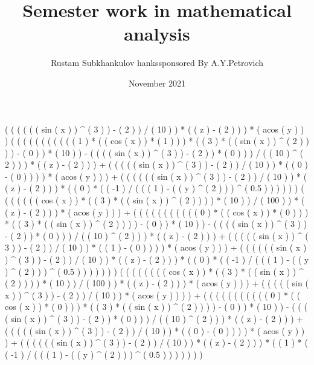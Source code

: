 \documentclass[a4paper, 12pt] {article}
\title{Semester work in mathematical analysis}
\author{Rustam Subkhankulov 	hanks{sponsored By A.Y.Petrovich}}
\date{November 2021}
\begin{document}
 
\maketitle
 (  (  (  (  (  ( sin ( x )  ) ^ ( 3 )  ) - ( 2 )  ) / ( 10 )  ) * (  ( z ) - ( 2 )  )  ) * ( acos ( y )  )  )  (  (  (  (  (  (  (  (  (  (  ( 1 ) * (  ( cos ( x )  ) * ( 1 )  )  ) * (  ( 3 ) * (  ( sin ( x )  ) ^ ( 2 )  )  )  ) - ( 0 )  ) * ( 10 )  ) - (  (  (  ( sin ( x )  ) ^ ( 3 )  ) - ( 2 )  ) * ( 0 )  )  ) / (  ( 10 ) ^ ( 2 )  )  ) * (  ( z ) - ( 2 )  )  ) + (  (  (  (  ( sin ( x )  ) ^ ( 3 )  ) - ( 2 )  ) / ( 10 )  ) * (  ( 0 ) - ( 0 )  )  )  ) * ( acos ( y )  )  ) + (  (  (  (  (  ( sin ( x )  ) ^ ( 3 )  ) - ( 2 )  ) / ( 10 )  ) * (  ( z ) - ( 2 )  )  ) * (  ( 0 ) * (  ( -1 ) / (  (  ( 1 ) - (  ( y ) ^ ( 2 )  )  ) ^ ( 0.5 )  )  )  )  )  )  (  (  (  (  (  (  ( cos ( x )  ) * (  ( 3 ) * (  ( sin ( x )  ) ^ ( 2 )  )  )  ) * ( 10 )  ) / ( 100 )  ) * (  ( z ) - ( 2 )  )  ) * ( acos ( y )  )  ) + (  (  (  (  (  (  (  (  (  (  ( 0 ) * (  ( cos ( x )  ) * ( 0 )  )  ) * (  ( 3 ) * (  ( sin ( x )  ) ^ ( 2 )  )  )  ) - ( 0 )  ) * ( 10 )  ) - (  (  (  ( sin ( x )  ) ^ ( 3 )  ) - ( 2 )  ) * ( 0 )  )  ) / (  ( 10 ) ^ ( 2 )  )  ) * (  ( z ) - ( 2 )  )  ) + (  (  (  (  ( sin ( x )  ) ^ ( 3 )  ) - ( 2 )  ) / ( 10 )  ) * (  ( 1 ) - ( 0 )  )  )  ) * ( acos ( y )  )  ) + (  (  (  (  (  ( sin ( x )  ) ^ ( 3 )  ) - ( 2 )  ) / ( 10 )  ) * (  ( z ) - ( 2 )  )  ) * (  ( 0 ) * (  ( -1 ) / (  (  ( 1 ) - (  ( y ) ^ ( 2 )  )  ) ^ ( 0.5 )  )  )  )  )  )  )  (  (  (  (  (  (  (  ( cos ( x )  ) * (  ( 3 ) * (  ( sin ( x )  ) ^ ( 2 )  )  )  ) * ( 10 )  ) / ( 100 )  ) * (  ( z ) - ( 2 )  )  ) * ( acos ( y )  )  ) + (  (  (  (  ( sin ( x )  ) ^ ( 3 )  ) - ( 2 )  ) / ( 10 )  ) * ( acos ( y )  )  )  ) + (  (  (  (  (  (  (  (  (  (  ( 0 ) * (  ( cos ( x )  ) * ( 0 )  )  ) * (  ( 3 ) * (  ( sin ( x )  ) ^ ( 2 )  )  )  ) - ( 0 )  ) * ( 10 )  ) - (  (  (  ( sin ( x )  ) ^ ( 3 )  ) - ( 2 )  ) * ( 0 )  )  ) / (  ( 10 ) ^ ( 2 )  )  ) * (  ( z ) - ( 2 )  )  ) + (  (  (  (  ( sin ( x )  ) ^ ( 3 )  ) - ( 2 )  ) / ( 10 )  ) * (  ( 0 ) - ( 0 )  )  )  ) * ( acos ( y )  )  ) + (  (  (  (  (  ( sin ( x )  ) ^ ( 3 )  ) - ( 2 )  ) / ( 10 )  ) * (  ( z ) - ( 2 )  )  ) * (  ( 1 ) * (  ( -1 ) / (  (  ( 1 ) - (  ( y ) ^ ( 2 )  )  ) ^ ( 0.5 )  )  )  )  )  )  ) 
\end{document}
